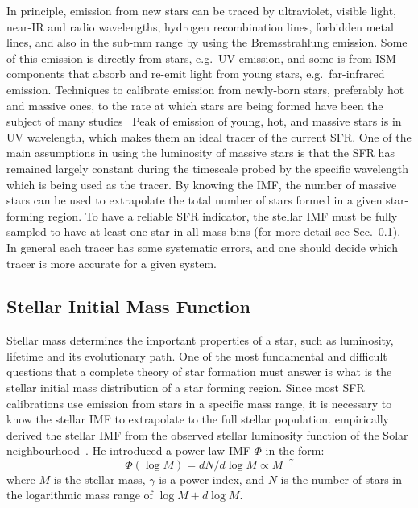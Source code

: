 In principle, emission from new stars can be traced by ultraviolet, visible light, near-IR and radio wavelengths, hydrogen recombination lines, forbidden metal lines, and also in the sub-mm range by using the Bremsstrahlung emission. 
Some of this emission is directly from stars, e.g.\ UV emission, and some is from ISM components that absorb and re-emit light from young stars, e.g.\ far-infrared emission.
Techniques to calibrate emission from newly-born stars, preferably hot and massive ones, to the rate at which stars are being formed have been the subject of many studies~\citep[e.g.][]{Calzetti07, Kennicutt11, Hao11,Bigiel08} 
Peak of emission of young, hot, and massive stars is in UV wavelength, which makes them an ideal tracer of the current SFR.
One of the main assumptions in using the luminosity of massive stars is that the SFR has remained largely constant during the timescale probed by the specific wavelength which is being used as the tracer. 
By knowing the IMF, the number of massive stars can be used to extrapolate the total number of stars formed in a given star-forming region.
To have a reliable SFR indicator, the stellar IMF must be fully sampled to have at least one star in all mass bins (for more detail see Sec.~\ref{sec: imf}).
In general each tracer has some systematic errors, and one should decide which tracer is more accurate for a given system. 

\subsection{Stellar Initial Mass Function}
\label{sec: imf}
Stellar mass determines the important properties of a star, such as luminosity, lifetime and its evolutionary path. 
One of the most fundamental and difficult questions that a complete theory of star formation must answer is what is the stellar initial mass distribution of a star forming region.
Since most SFR calibrations use emission from stars in a specific mass range, it is necessary to know the stellar IMF to extrapolate to the full stellar population.
\cite{Salpeter55} empirically derived the stellar IMF from the observed stellar luminosity function of the Solar neighbourhood~\citep{Shu87}. 
He introduced a power-law IMF $\Phi$  in the form:
\begin{equation}
\label{equ: salp}
\Phi (\log M) = dN / d \log M \propto M^{-\gamma }
\end{equation} 
where $M$ is the stellar mass, $\gamma$ is a power index, and $N$ is the number of stars in the logarithmic mass range of $\log M + d\log M$.

